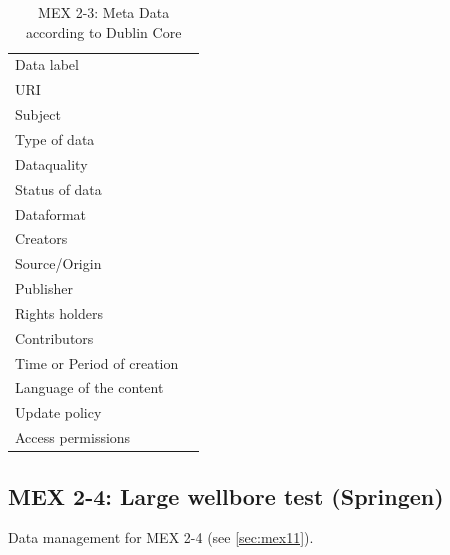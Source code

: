 


\begin{table}[h!]
\caption{MEX 2-3: Meta Data according to Dublin Core}
\label{tab:}
\small
\begin{tabular}{R{3cm}|L{7cm}}
\hline
%
Data label &  \\
URI &  \\
Subject  &  \\
Type of data  &  \\
Dataquality  &  \\
Status of data  &  \\
Dataformat  & \\
Creators  &  \\
Source/Origin &  \\
Publisher  &  \\
Rights holders &  \\
Contributors &  \\
Time or Period of creation &  \\
Language of the content &  \\
Update policy &  \\
Access permissions &  \\
%
\hline
\end{tabular}
\end{table}

\subsection{MEX 2-4: Large wellbore test (Springen)}

Data management for MEX 2-4 (see \ref{sec:mex11}).

